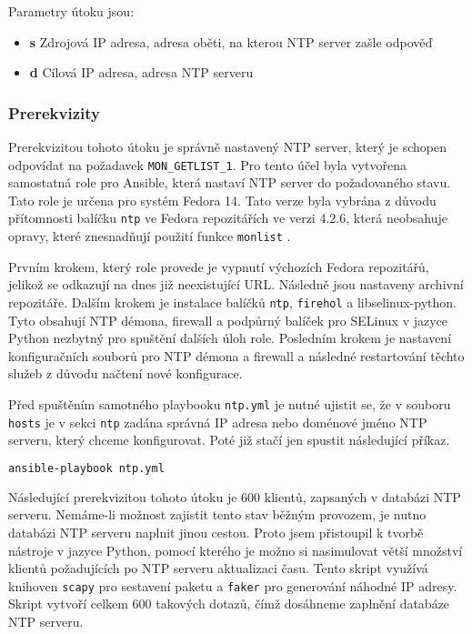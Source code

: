 \noindent Parametry útoku jsou:
\begin{itemize}
	\item \textbf{s} Zdrojová IP adresa, adresa oběti, na kterou NTP server zašle odpověď
	\item \textbf{d} Cílová IP adresa, adresa NTP serveru
\end{itemize}

\subsubsection{Prerekvizity}
Prerekvizitou tohoto útoku je správně nastavený NTP server, který je schopen odpovídat na požadavek \texttt{MON\_GETLIST\_1}. Pro tento účel byla vytvořena samostatná role pro Ansible, která nastaví NTP server do požadovaného stavu. Tato role je určena pro systém Fedora 14. Tato verze byla vybrána z důvodu přítomnosti balíčku \texttt{ntp} ve Fedora repozitářích ve verzi 4.2.6, která neobsahuje opravy, které znesnadňují použití funkce \texttt{monlist} \cite{ntpbug1532}.

Prvním krokem, který role provede je vypnutí výchozích Fedora repozitářů, jelikož se odkazují na dnes již neexistující URL. Následně jsou nastaveny archivní repozitáře. Dalším krokem je instalace balíčků \texttt{ntp}, \texttt{firehol} a libselinux-python. Tyto obsahují NTP démona, firewall a podpůrný balíček pro SELinux v jazyce Python nezbytný pro spuštění dalších úloh role. 
Posledním krokem je nastavení konfiguračních souborů pro NTP démona a firewall a následné restartování těchto služeb z důvodu načtení nové konfigurace.

Před spuštěním samotného playbooku \texttt{ntp.yml} je nutné ujistit se, že v souboru \texttt{hosts} je v sekci \texttt{ntp} zadána správná IP adresa nebo doménové jméno NTP serveru, který chceme konfigurovat. Poté již stačí jen spustit následující příkaz.

\begin{lstlisting}[language=bash]
ansible-playbook ntp.yml
\end{lstlisting}

Následující prerekvizitou tohoto útoku je 600 klientů, zapsaných v databázi NTP serveru. Nemáme-li možnost zajistit tento stav běžným provozem, je nutno databázi NTP serveru naplnit jinou cestou. Proto jsem přistoupil k tvorbě nástroje v jazyce Python, pomocí kterého je možno si nasimulovat větší množství klientů požadujících po NTP serveru aktualizaci času. Tento skript využívá knihoven \texttt{scapy} pro sestavení paketu a \texttt{faker} pro generování náhodné IP adresy. Skript vytvoří celkem 600 takových dotazů, čímž dosáhneme zaplnění databáze NTP serveru.


